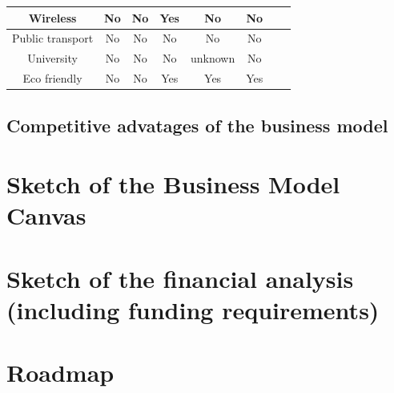 \documentclass[12pt]{article}
\begin{document}
\begin{table}[h!]
\begin{center}
\begin{tabular}{|c|c|c|c|c|c|c|c|}
                    \hline
                    Wireless                             & No & No & Yes & No & No \\
                    \hline
                    Public transport            & No & No & No & No & No \\
                    \hline
                    University                  & No & No & No & unknown & No \\
                    \hline
                    Eco friendly                         & No & No & Yes & Yes & Yes \\
                    \hline
                  \end{tabular}
                \end{center}
              \end{table}
        \subsection{Competitive advatages of the business model}
    \section{Sketch of the Business Model Canvas}
    \section{Sketch of the financial analysis (including funding requirements)}
    \section{Roadmap}
\end{document}
